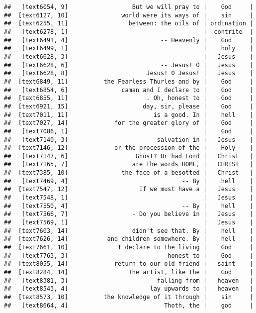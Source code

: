 \documentclass[]{article}
\begin{document}
\begin{verbatim}
##   [text6054, 9]                  But we will pray to |    God     |
##  [text6127, 10]               world were its ways of |    sin     |
##  [text6255, 11]                 between: the oils of | ordination |
##   [text6278, 1]                                      |  contrite  |
##   [text6491, 4]                          -- Heavenly |    God     |
##   [text6499, 1]                                      |    holy    |
##   [text6628, 3]                                   -- |   Jesus    |
##   [text6628, 6]                          -- Jesus! O |   Jesus    |
##   [text6628, 8]                      Jesus! O Jesus! |   Jesus    |
##  [text6849, 11]          the Fearless Thurles and by |    God     |
##   [text6854, 6]               caman and I declare to |    God     |
##  [text6855, 11]                      . Oh, honest to |    God     |
##  [text6921, 15]                     day, sir, please |    God     |
##  [text7011, 11]                        is a good. In |    hell    |
##  [text7027, 14]             for the greater glory of |    God     |
##   [text7086, 1]                                      |    God     |
##   [text7140, 3]                         salvation in |   Jesus    |
##  [text7146, 12]             or the procession of the |    Holy    |
##   [text7147, 6]                   Ghost? Or had Lord |   Christ   |
##   [text7165, 7]                  are the words HOME, |   CHRIST   |
##  [text7385, 10]               the face of a besotted |   Christ   |
##   [text7469, 4]                                -- By |    hell    |
##  [text7547, 12]                    If we must have a |   Jesus    |
##   [text7548, 1]                                      |   Jesus    |
##   [text7550, 4]                                -- By |    hell    |
##   [text7566, 7]                  - Do you believe in |   Jesus    |
##   [text7569, 1]                                      |   Jesus    |
##  [text7603, 14]                  didn't see that. By |    hell    |
##  [text7626, 14]           and children somewhere. By |    hell    |
##  [text7661, 10]              I declare to the living |    God     |
##   [text7763, 3]                            honest to |    God     |
##  [text8055, 14]             return to our old friend |   saint    |
##  [text8284, 14]                 The artist, like the |    God     |
##   [text8381, 3]                         falling from |   heaven   |
##   [text8543, 4]                       lay upwards to |   heaven   |
##  [text8573, 10]          the knowledge of it through |    sin     |
##   [text8664, 4]                           Thoth, the |    god     |

\end{verbatim}
\end{document}
